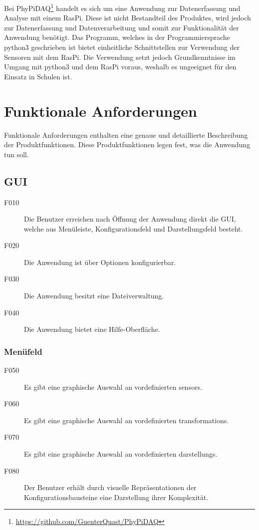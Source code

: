 \documentclass[parskip=full]{scrartcl}
\begin{document}
Bei PhyPiDAQ\footnote{\url{https://github.com/GuenterQuast/PhyPiDAQ}} handelt es sich um eine Anwendung zur Datenerfassung und Analyse mit einem \gls{RasPi}. Diese ist nicht Bestandteil des Produktes, wird jedoch zur Datenerfassung und Datenverarbeitung und somit zur Funktionalität der Anwendung  benötigt. Das Programm, welches in der Programmiersprache \gls{python3} geschrieben ist bietet einheitliche Schnittstellen zur Verwendung der Sensoren mit dem \gls{RasPi}. Die Verwendung setzt jedoch Grundkenntnisse im Umgang mit \gls{python3} und dem \gls{RasPi} voraus, weshalb es ungeeignet für den Einsatz in Schulen ist.

\clearpage
\section{Funktionale Anforderungen}\label{funktionale}

Funktionale Anforderungen enthalten eine genaue und detaillierte Beschreibung der Produktfunktionen. Diese Produktfunktionen legen fest, was die Anwendung tun soll.


\subsection{GUI} %

\begin{description}
\item[F010] Die Benutzer erreichen nach Öffnung der Anwendung direkt die \gls{GUI}, welche aus Menüleiste, Konfigurationsfeld und Darstellungsfeld besteht.
\item[F020] Die Anwendung ist über Optionen konfigurierbar. 
\item[F030] Die Anwendung besitzt eine Dateiverwaltung.
\item[F040] Die Anwendung bietet eine Hilfe-Oberfläche.
\end{description}

\subsubsection{Menüfeld}

\begin{description}
\item[F050] Es gibt eine graphische Auswahl an vordefinierten \glspl{sensor}.
\item[F060] Es gibt eine graphische Auswahl an vordefinierten \glspl{transformation}.
\item[F070] Es gibt eine graphische Auswahl an vordefinierten \glspl{darstellung}.
\item[F080] Der Benutzer erhält durch visuelle Repräsentationen der Konfigurationsbausteine eine Darstellung ihrer Komplexität.
\end{description}
\end{document}
